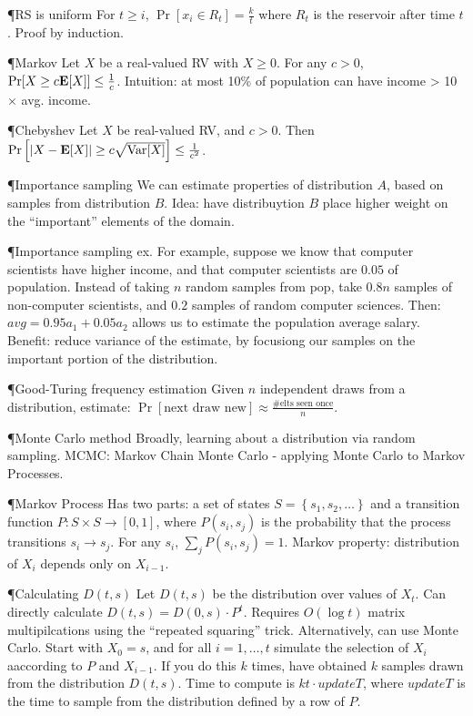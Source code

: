 \documentclass[8pt]{article}
\begin{document}
  \P{RS is uniform} For $t \geq i$, $\Pr[x_i \in R_t] = \frac{k}{t}$ where $R_t$ is the reservoir after time $t$.  Proof by induction.

  \P{Markov} Let $X$ be a real-valued RV with $X \geq 0$.  For any $c > 0$, $\Pr[X \geq c \mathbf{E}[X]]\leq \frac{1}{c}$.  Intuition: at most 10\% of population can have income > 10 $\times$ avg. income.

  \P{Chebyshev} Let $X$ be real-valued RV, and $c > 0$.  Then $\Pr \left[ |X - \mathbf{E}[X]| \geq c \sqrt{\text{Var}[X]} \right] \leq \frac{1}{c^2}$.

  \P{Importance sampling} We can estimate properties of distribution $A$, based on samples from distribution $B$.  Idea: have distribuytion $B$ place higher weight on the ``important'' elements of the domain.  
  
  \P{Importance sampling ex.} For example, suppose we know that computer scientists have higher income, and that computer scientists are $0.05$ of population. Instead of taking $n$ random samples from pop, take $0.8n$ samples of non-computer scientists, and $0.2$ samples of random computer sciences.  Then: $avg = 0.95 a_1 + 0.05 a_2$ allows us to estimate the population average salary.  Benefit: reduce variance of the estimate, by focusiong our samples on the important portion of the distribution.

  \P{Good-Turing frequency estimation}  Given $n$ independent draws from a distribution, estimate: $\Pr[\text{next draw new}] \approx \frac{\text{\# elts seen once}}{n}$.

  \P{Monte Carlo method} Broadly, learning about a distribution via random sampling. MCMC: Markov Chain Monte Carlo - applying Monte Carlo to Markov Processes.

  \P{Markov Process} Has two parts: a set of states $S = \left\{ s_1, s_2, \dots \right\}$ and a transition function $P: S \times S \to [0, 1]$, where $P(s_i, s_j)$ is the probability that the process transitions $s_i \to s_j$.  For any $s_i$, $\sum_{j} P(s_i, s_j) = 1$.  Markov property: distribution of $X_i$ depends only on $X_{i-1}$.

  \P{Calculating $D(t, s)$} Let $D(t, s)$ be the distribution over values of $X_t$.  Can directly calculate $D(t, s) = D(0, s) \cdot P^t$. Requires $O(\log t)$ matrix multipilcations using the ``repeated squaring'' trick.  Alternatively, can use Monte Carlo.  Start with $X_0 = s$, and for all $i = 1, \dots, t$  simulate the selection of $X_i$ aaccording to $P$ and $X_{i-1}$.   If you do this $k$ times, have obtained $k$ samples drawn from the distribution $D(t, s)$.  Time to compute is $kt \cdot update T$, where $updateT$ is the time to sample from the distribution defined by a row of $P$.
\end{document}

